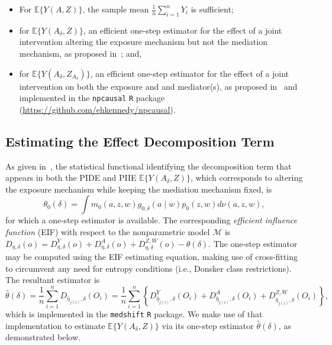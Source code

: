 \begin{itemize}[topsep=0pt,itemsep=0pt,partopsep=1ex,parsep=1ex]
\item For $\mathbb{E}\{Y(A, Z)\}$, the sample mean $\frac{1}{n}\sum_{i=1}^n
  Y_i$ is sufficient;
\item for $\mathbb{E}\{Y(A_{\delta}, Z)\}$, an efficient one-step estimator for
  the effect of a joint intervention altering the exposure mechanism but not the
  mediation mechanism, as proposed in~\citet{diaz2020causal}; and,
\item for $\mathbb{E}\{Y(A_{\delta}, Z_{A_{\delta}})\}$, an efficient one-step
  estimator for the effect of a joint intervention on both the exposure and and
  mediator(s), as proposed in~\citet{kennedy2017nonparametric} and implemented
  in the \texttt{npcausal} \texttt{R} package
  (\url{https://github.com/ehkennedy/npcausal}).
\end{itemize}

\subsection{Estimating the Effect Decomposition Term}

As given in~\citet{diaz2020causal}, the statistical functional identifying the
decomposition term that appears in both the PIDE and PIIE
$\mathbb{E}\{Y(A_{\delta}, Z)\}$, which corresponds to altering the exposure
mechanism while keeping the mediation mechanism fixed, is
\begin{equation*}
  \theta_0(\delta) = \int m_0(a, z, w) g_{0,\delta}(a \mid w) p_0(z, w)
    d\nu(a, z, w),
\end{equation*}
for which a one-step estimator is available. The corresponding \textit{efficient
influence function} (EIF) with respect to the nonparametric model $\mathcal{M}$
is $D_{\eta,\delta}(o) = D^Y_{\eta,\delta}(o)
+ D^A_{\eta,\delta}(o) + D^{Z,W}_{\eta,\delta}(o) - \theta(\delta)$. The
one-step estimator may be computed using the EIF estimating equation, making use
of cross-fitting~\citep{zheng2011cross,chernozhukov2018double} to circumvent any
need for entropy conditions (i.e., Donsker class restrictions). The resultant
estimator is
\begin{equation*}
  \hat{\theta}(\delta) = \frac{1}{n} \sum_{i = 1}^n D_{\hat{\eta}_{j(i)},
  \delta}(O_i) = \frac{1}{n} \sum_{i = 1}^n \left\{ D^Y_{\hat{\eta}_{j(i)},
  \delta}(O_i) + D^A_{\hat{\eta}_{j(i)}, \delta}(O_i) +
  D^{Z,W}_{\hat{\eta}_{j(i)}, \delta}(O_i) \right\},
\end{equation*}
which is implemented in the \texttt{medshift} \texttt{R} package. We make use of
that implementation to estimate $\mathbb{E}\{Y(A_{\delta}, Z)\}$ via its
one-step estimator $\hat{\theta}(\delta)$, as demonstrated below.

